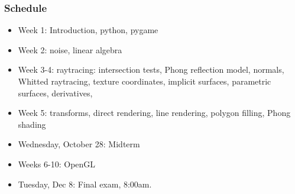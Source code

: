 \documentclass[slidestop,xcolor=pst]{beamer}
\newcommand{\sect}[1]{\begin{frame}\frametitle{#1}}
\begin{document}
\sect{Schedule}
  \begin{itemize}
\item Week 1: Introduction, python, pygame
\item Week 2: noise, linear algebra
\item Week 3-4: raytracing: intersection tests, Phong reflection
  model, normals, Whitted raytracing, texture coordinates, implicit
  surfaces, parametric surfaces, derivatives, 
\item Week 5:     transforms, direct rendering, line rendering,
  polygon filling, Phong shading
\item Wednesday, October 28:     Midterm
\item Weeks 6-10:       OpenGL
\item Tuesday, Dec 8:  Final exam, 8:00am.
\end{itemize}
\end{frame}
\end{document}
